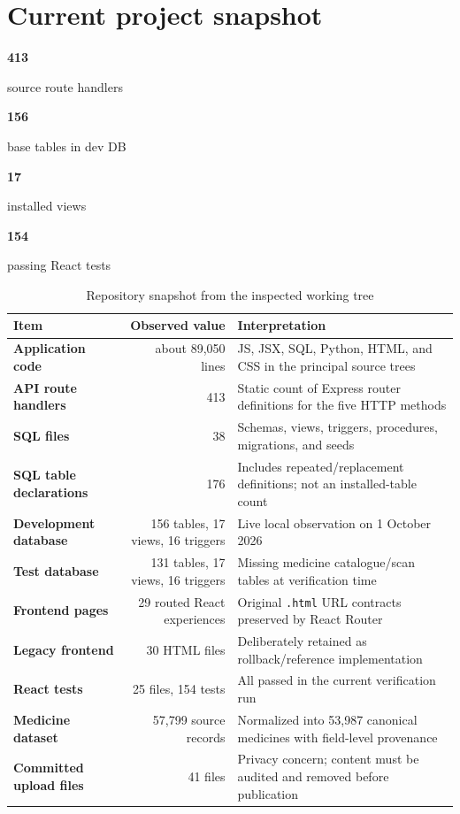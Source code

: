 \documentclass[12pt,a4paper,oneside]{report}
\newcommand{\code}[1]{\texttt{#1}}
\newcommand{\projectmetric}[2]{%
  \begin{minipage}[t]{0.22\textwidth}\centering
  {\Large\bfseries\color{nationgreen}#1}\par
  {\small #2}
  \end{minipage}}
\begin{document}
\section{Current project snapshot}

\begin{center}
\projectmetric{413}{source route handlers}\hfill
\projectmetric{156}{base tables in dev DB}\hfill
\projectmetric{17}{installed views}\hfill
\projectmetric{154}{passing React tests}
\end{center}

\vspace{1em}

\begin{table}[htbp]
\centering
\caption{Repository snapshot from the inspected working tree}
\label{tab:snapshot}
\begin{tabularx}{\textwidth}{>{\bfseries}l r X}
\toprule
Item & Observed value & Interpretation\\
\midrule
Application code & about 89,050 lines & JS, JSX, SQL, Python, HTML, and CSS in the principal source trees\\
API route handlers & 413 & Static count of Express router definitions for the five HTTP methods\\
SQL files & 38 & Schemas, views, triggers, procedures, migrations, and seeds\\
SQL table declarations & 176 & Includes repeated/replacement definitions; not an installed-table count\\
Development database & 156 tables, 17 views, 16 triggers & Live local observation on 1 October 2026\\
Test database & 131 tables, 17 views, 16 triggers & Missing medicine catalogue/scan tables at verification time\\
Frontend pages & 29 routed React experiences & Original \code{.html} URL contracts preserved by React Router\\
Legacy frontend & 30 HTML files & Deliberately retained as rollback/reference implementation\\
React tests & 25 files, 154 tests & All passed in the current verification run\\
Medicine dataset & 57,799 source records & Normalized into 53,987 canonical medicines with field-level provenance\\
Committed upload files & 41 files & Privacy concern; content must be audited and removed before publication\\
\bottomrule
\end{tabularx}
\end{table}
\end{document}
